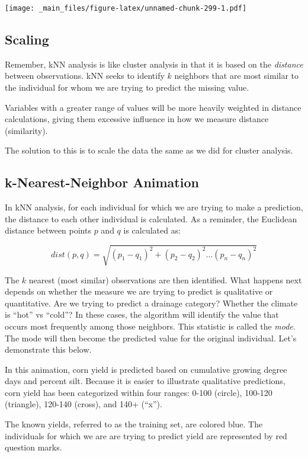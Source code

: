 \documentclass[
]{book}
\begin{document}
\texttt{[image: \_main\_files/figure-latex/unnamed-chunk-299-1.pdf]}

\hypertarget{scaling-1}{%
\subsection{Scaling}\label{scaling-1}}

Remember, kNN analysis is like cluster analysis in that it is based on the \emph{distance} between observations. kNN seeks to identify \(k\) neighbors that are most similar to the individual for whom we are trying to predict the missing value.

Variables with a greater range of values will be more heavily weighted in distance calculations, giving them excessive influence in how we measure distance (similarity).

The solution to this is to scale the data the same as we did for cluster analysis.

\hypertarget{k-nearest-neighbor-animation}{%
\subsection{k-Nearest-Neighbor Animation}\label{k-nearest-neighbor-animation}}

In kNN analysis, for each individual for which we are trying to make a prediction, the distance to each other individual is calculated. As a reminder, the Euclidean distance between points \(p\) and \(q\) is calculated as:

\[dist(p,q) = \sqrt{(p_1 - q_1)^2 + (p_2 - q_2)^2 ... (p_n - q_n)^2} \]

The \(k\) nearest (most similar) observations are then identified. What happens next depends on whether the measure we are trying to predict is qualitative or quantitative. Are we trying to predict a drainage category? Whether the climate is ``hot'' vs ``cold''? In these cases, the algorithm will identify the value that occurs most frequently among those neighbors. This statistic is called the \emph{mode}. The mode will then become the predicted value for the original individual. Let's demonstrate this below.

In this animation, corn yield is predicted based on cumulative growing degree days and percent silt. Because it is easier to illustrate qualitative predictions, corn yield has been categorized within four ranges: 0-100 (circle), 100-120 (triangle), 120-140 (cross), and 140+ (``x'').

The known yields, referred to as the training set, are colored blue. The individuals for which we are are trying to predict yield are represented by red question marks.
\end{document}
